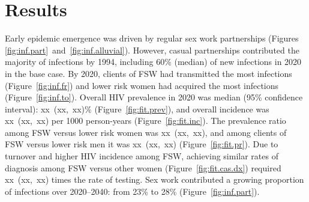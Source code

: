 \section*{Results}\label{res}
\newcommand{\xci}[1]{xx~(xx,~xx)\xspace}
Early epidemic emergence was driven by regular sex work partnerships
(Figures \ref{fig:inf.part}~and~\ref{fig:inf.alluvial}).
However, casual partnerships contributed the majority of infections by 1994, %
including 60\% (median) of new infections in 2020 in the base case. %
By 2020, clients of FSW had transmitted the most infections (Figure~\ref{fig:inf.fr})
and lower risk women had acquired the most infections (Figure~\ref{fig:inf.to}).
Overall HIV prevalence in 2020 was median (95\% confidence interval):
\xci{bc/prev.all.2020}\% (Figure~\ref{fig:fit.prev}),
and overall incidence was \xci{bc/inc.all.2020} per 1000 person-years (Figure~\ref{fig:fit.inc}).
The prevalence ratio among FSW versus lower risk women was \xci{bc/pr.fsw.2020},
and among clients of FSW versus lower risk men it was \xci{bc/pr.cli.2020} (Figure~\ref{fig:fit.pr}).
Due to turnover and higher HIV incidence among FSW,
achieving similar rates of diagnosis among FSW versus other women (Figure~\ref{fig:fit.cas.dx})
required \xci{Rdx.fsw} times the rate of testing.
Sex work contributed a growing proportion of infections
over 2020--2040: from 23\% to 28\% (Figure~\ref{fig:inf.part}). %
